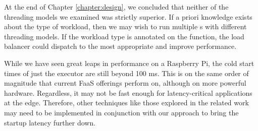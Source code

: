 At the end of Chapter \ref{chapter:design}, we concluded that neither of the threading models we examined was strictly superior. If a priori knowledge exists about the type of workload, then we may wish to run multiple s with different threading models. If the workload type is annotated on the function, the load balancer could dispatch to the most appropriate  and improve performance.

While we have seen great leaps in performance on a Raspberry Pi, the cold start times of just the executor are still beyond 100 ms. This is on the same order of magnitude that current FaaS offerings perform on, although on more powerful hardware. Regardless, it may not be fast enough for latency-critical applications at the edge. Therefore, other techniques like those explored in the related work may need to be implemented in conjunction with our approach to bring the startup latency further down.

